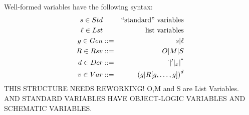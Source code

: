  Well-formed variables have the following syntax:
 \begin{eqnarray*}
    s \in Std && \mbox{``standard'' variables}
 \\ \ell \in Lst && \mbox{list variables}
 \\ g \in Gen &::=&  s | \ell
 \\ R \in Rsv &::=& O | M | S
 \\ d \in Dcr &::=& {}^\cdot | {}' | {}_x | {}^{``}
 \\ v \in Var &::=& \left( g | R [g,\ldots,g] \right)^d
 \end{eqnarray*}
THIS STRUCTURE NEEDS REWORKING! O,M and S are List Variables.
AND STANDARD VARIABLES HAVE OBJECT-LOGIC VARIABLES AND SCHEMATIC VARIABLES.
